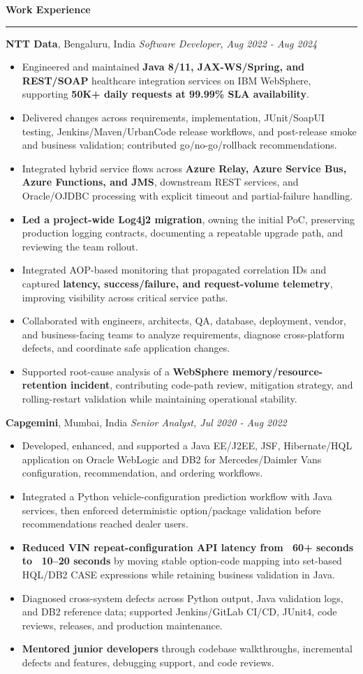 \documentclass[11pt,letterpaper]{article}
\newcommand{\ressection}[1]{\Needspace{6\baselineskip}\vspace{8pt}\par\textbf{#1}\par\vspace{2pt}\hrule\vspace{5pt}}
\begin{document}
\ressection{Work Experience}
\textbf{NTT Data}, Bengaluru, India \hfill \textit{Software Developer, Aug 2022 - Aug 2024}
\begin{itemize}
  \item Engineered and maintained \textbf{Java 8/11, JAX-WS/Spring, and REST/SOAP} healthcare integration services on IBM WebSphere, supporting \textbf{50K+ daily requests at 99.99\% SLA availability}.
  \item Delivered changes across requirements, implementation, JUnit/SoapUI testing, Jenkins/Maven/UrbanCode release workflows, and post-release smoke and business validation; contributed go/no-go/rollback recommendations.
  \item Integrated hybrid service flows across \textbf{Azure Relay, Azure Service Bus, Azure Functions, and JMS}, downstream REST services, and Oracle/OJDBC processing with explicit timeout and partial-failure handling.
  \item \textbf{Led a project-wide Log4j2 migration}, owning the initial PoC, preserving production logging contracts, documenting a repeatable upgrade path, and reviewing the team rollout.
  \item Integrated AOP-based monitoring that propagated correlation IDs and captured \textbf{latency, success/failure, and request-volume telemetry}, improving visibility across critical service paths.
  \item Collaborated with engineers, architects, QA, database, deployment, vendor, and business-facing teams to analyze requirements, diagnose cross-platform defects, and coordinate safe application changes.
  \item Supported root-cause analysis of a \textbf{WebSphere memory/resource-retention incident}, contributing code-path review, mitigation strategy, and rolling-restart validation while maintaining operational stability.
\end{itemize}
\textbf{Capgemini}, Mumbai, India \hfill \textit{Senior Analyst, Jul 2020 - Aug 2022}
\begin{itemize}
  \item Developed, enhanced, and supported a Java EE/J2EE, JSF, Hibernate/HQL application on Oracle WebLogic and DB2 for Mercedes/Daimler Vans configuration, recommendation, and ordering workflows.
  \item Integrated a Python vehicle-configuration prediction workflow with Java services, then enforced deterministic option/package validation before recommendations reached dealer users.
  \item \textbf{Reduced VIN repeat-configuration API latency from ~60+ seconds to ~10--20 seconds} by moving stable option-code mapping into set-based HQL/DB2 CASE expressions while retaining business validation in Java.
  \item Diagnosed cross-system defects across Python output, Java validation logs, and DB2 reference data; supported Jenkins/GitLab CI/CD, JUnit4, code reviews, releases, and production maintenance.
  \item \textbf{Mentored junior developers} through codebase walkthroughs, incremental defects and features, debugging support, and code reviews.
\end{itemize}
\end{document}
